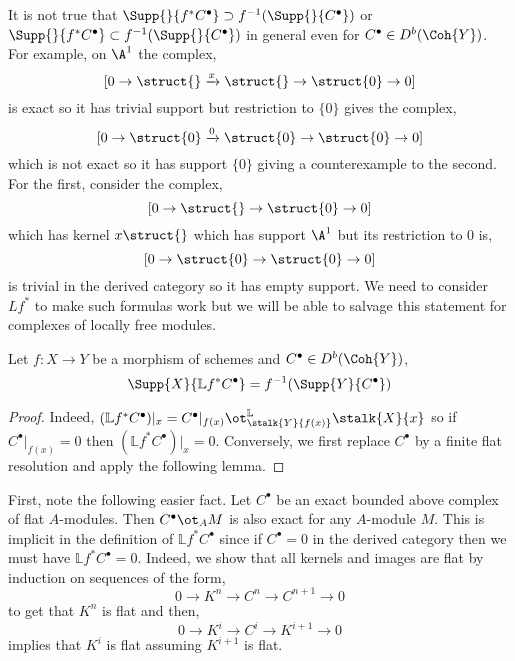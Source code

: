 \documentclass[12pt]{article}
\begin{document}
\begin{rmk}
It is not true that $\Supp{}{f^* C^\bullet} \supset f^{-1}(\Supp{}{C^\bullet})$ or $\Supp{}{f^* C^\bullet} \subset f^{-1}(\Supp{}{C^\bullet})$ in general even for $C^\bullet \in D^b(\Coh{Y})$. For example, on $\A^1$ the complex,
\[ [0 \to \struct{} \xrightarrow{x} \struct{} \to \struct{0} \to 0] \]
is exact so it has trivial support but restriction to $\{ 0 \}$ gives the complex,
\[ [0 \to \struct{0} \xrightarrow{0} \struct{0} \to \struct{0} \to 0] \]
which is not exact so it has support $\{ 0 \}$ giving a counterexample to the second. For the first, consider the complex,
\[ [ 0 \to \struct{} \to \struct{0} \to 0] \]
which has kernel $x \struct{}$ which has support $\A^1$ but its restriction to $0$ is,
\[ [0 \to \struct{0} \to \struct{0} \to 0] \]
is trivial in the derived category so it has empty support. We need to consider $L f^*$ to make such formulas work but we will be able to salvage this statement for complexes of locally free modules.
\end{rmk}

\newcommand{\LL}{\mathbb{L}}

\begin{lemma}
Let $f : X \to Y$ be a morphism of schemes and $C^\bullet \in D^b(\Coh{Y})$,
\[ \Supp{X}{\LL f^* C^\bullet} = f^{-1}(\Supp{Y}{C^\bullet}) \]
\end{lemma}

\begin{proof}
Indeed, $(\LL f^* C^\bullet)|_{x} = C^\bullet|_{f(x)} \ot^{\LL}_{\stalk{Y}{f(x)}} \stalk{X}{x}$ so if $C^\bullet|_{f(x)} = 0$ then $(\LL f^* C^\bullet)|_x = 0$. Conversely, we first replace $C^\bullet$ by a finite flat resolution and apply the following lemma.
\end{proof}

\begin{rmk}
First, note the following easier fact. Let $C^\bullet$ be an exact bounded above complex of flat $A$-modules. Then $C^\bullet \ot_A M$ is also exact for any $A$-module $M$. This is implicit in the definition of $\LL f^* C^\bullet$ since if $C^\bullet = 0$ in the derived category then we must have $\LL f^* C^\bullet = 0$. Indeed, we show that all kernels and images are flat by induction on sequences of the form,
\[ 0 \to K^n \to C^n \to C^{n+1} \to 0 \]
to get that $K^n$ is flat and then,
\[ 0 \to K^i \to C^i \to K^{i+1} \to 0 \]
implies that $K^i$ is flat assuming $K^{i+1}$ is flat. 
\end{rmk}
\end{document}
